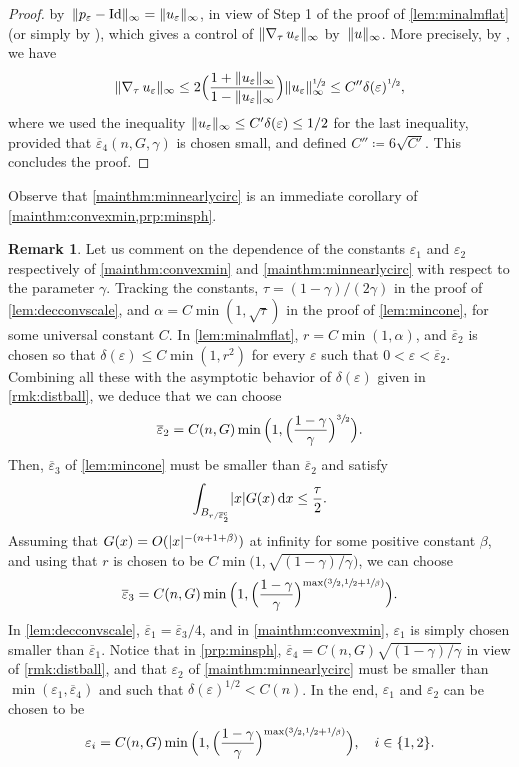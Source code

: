 \documentclass[JEP,XML,SOM,Unicode,published]{cedram}
\numberwithin{equation}{section}
\theoremstyle{plain}
\theoremstyle{definition}
\newtheorem{rmk}[thm]{Remark}
\newcommand{\dx}{\mathop{}\mathopen{}\mathrm{d}x}
\let\eps\varepsilon
\let\ol\overline
\newcommand{\id}{{\mathrm{Id}}}
\newcommand{\compl}{{\mathrm{c}}}
\newcommand{\grad}{\nabla}
\DeclarePairedDelimiter{\abs}{\lvert}{\rvert}
\DeclarePairedDelimiter{\norm}{\lVert}{\rVert}
\begin{document}
\begin{proof}
by~$\norm{p_\eps-\id}_{\infty}=\norm{u_\eps}_{\infty}$, in view of Step 1 of the proof of
\cref{lem:minalmflat} (or simply by \cite[Cor.\,1]{Oss1987}), which gives a control of
$\norm{\grad_\tau\, u_\eps}_{\infty}$ by~$\norm{u}_{\infty}$. More precisely, by
\cite[Ineq.\,$(**)$]{Fug1989}, we have
\[
\norm{\grad_\tau\, u_\eps}_{\infty}
\leq 2\Bigl(\frac{1+\norm{u_\eps}_{\infty}}{1-\norm{u_\eps}_{\infty}} \Bigr)
\norm{u_\eps}_{\infty}^{\sfrac{1}{2}} \leq C''\delta(\eps)^{\sfrac{1}{2}},
\]
where we used the inequality $\norm{u_\eps}_\infty\leq C'\delta(\eps)\leq 1/2$ for the last
inequality, provided that $\ol{\eps}_4(n,G,\gamma)$ is chosen small, and defined $C''\coloneqq
6\sqrt{C'}$. This concludes the proof.
\end{proof}

Observe that \cref{mainthm:minnearlycirc} is an immediate corollary of
\cref{mainthm:convexmin,prp:minsph}.

\begin{rmk}\label{rmk:depeps12}
Let us comment on the dependence of the constants $\eps_1$ and $\eps_2$ respectively of
\cref{mainthm:convexmin} and \cref{mainthm:minnearlycirc} with respect to the parameter $\gamma$. Tracking
the constants, $\tau=(1-\gamma)/(2\gamma)$ in the proof of \cref{lem:decconvscale}, and
$\alpha=C \min(1,\sqrt{\tau})$ in the proof of \cref{lem:mincone}, for some universal constant $C$.
In \cref{lem:minalmflat}, $r=C\min(1,\alpha)$, and $\ol{\eps}_2$ is chosen so that $\delta(\eps)\leq
C\min(1,r^2)$ for every $\eps$ such that $0<\eps<\ol{\eps}_2$. Combining all these with the asymptotic behavior of
$\delta(\eps)$ given in \cref{rmk:distball}, we deduce that we can choose
\[
\ol{\eps}_2=C(n,G)\min\Big(1,\Big(\frac{1-\gamma}{\gamma}\Big)^{\sfrac{3}{2}}\Big).
\]
Then, $\ol{\eps}_3$ of \cref{lem:mincone} must be smaller than $\ol{\eps}_2$ and satisfy
\[
\int_{B_{r/\ol{\eps}_2^\compl}} \abs{x}G(x)\dx\leq \frac{\tau}{2}.
\]
Assuming that $G(x)=O(\abs{x}^{-(n+1+\beta)})$ at infinity for some positive constant $\beta$, and
using that $r$ is chosen to be $C\min\big(1,\sqrt{(1-\gamma)/\gamma}\big)$,
we can choose
\[
\ol{\eps}_3=C(n,G)\min\Big(1,\Big(\frac{1-\gamma}{\gamma}\Big)^{\max\left(\sfrac{3}{2},\sfrac{1}{2}
+\sfrac{1}{\beta}\right)}\Big).
\]
In \cref{lem:decconvscale}, $\ol{\eps}_1=\ol{\eps}_3/4$, and in \cref{mainthm:convexmin},
$\eps_1$ is simply chosen smaller than $\ol{\eps}_1$. Notice that in \cref{prp:minsph},
$\ol{\eps}_4=C(n,G)\sqrt{(1-\gamma)/\gamma}$ in view of
\cref{rmk:distball}, and that $\eps_2$ of \cref{mainthm:minnearlycirc} must be smaller than
$\min(\eps_1,\ol{\eps}_4)$ and such that $\delta(\eps)^{1/2}< C(n)$. In the end, $\eps_1$ and
$\eps_2$ can be chosen to be
\[
\eps_i=C(n,G)\min\Big(1,\Big(\frac{1-\gamma}{\gamma}\Big)^{\max\left(\sfrac{3}{2},\sfrac{1}{2}
+\sfrac{1}{\beta}\right)}\Big),\quad i\in\{1,2\}.
\]
\end{rmk}
\end{document}
